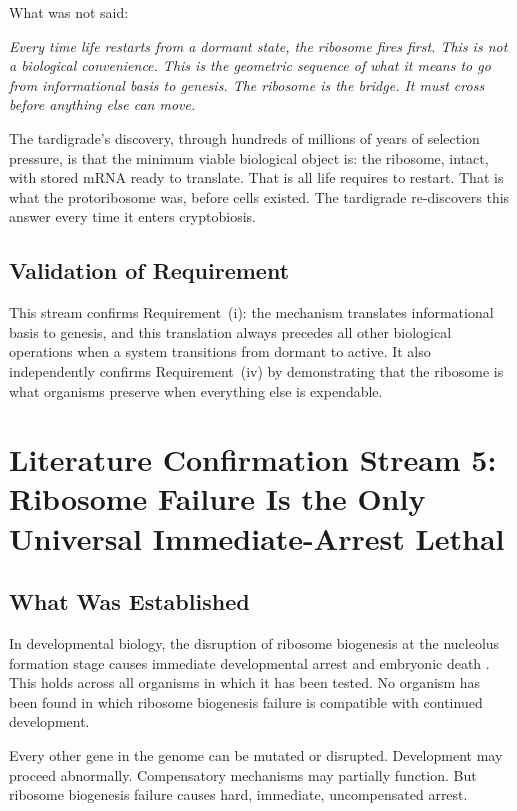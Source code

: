 \documentclass[11pt]{article}
\theoremstyle{definition}
\begin{document}
What was not said:

\emph{Every time life restarts from a dormant state, the ribosome
fires first.
This is not a biological convenience.
This is the geometric sequence of what it means to go from
informational basis to genesis.
The ribosome is the bridge.
It must cross before anything else can move.}

The tardigrade's discovery, through hundreds of millions of years
of selection pressure, is that the minimum viable biological object
is: the ribosome, intact, with stored mRNA ready to translate.
That is all life requires to restart.
That is what the protoribosome was, before cells existed.
The tardigrade re-discovers this answer every time it enters
cryptobiosis.

\subsection{Validation of Requirement}

This stream confirms Requirement~(i): the mechanism translates
informational basis to genesis, and this translation always
precedes all other biological operations when a system transitions
from dormant to active.
It also independently confirms Requirement~(iv) by demonstrating
that the ribosome is what organisms preserve when everything else
is expendable.

\section{Literature Confirmation Stream 5:\\
Ribosome Failure Is the Only Universal Immediate-Arrest Lethal}
\label{sec:literature5}

\subsection{What Was Established}

In developmental biology, the disruption of ribosome biogenesis
at the nucleolus formation stage causes immediate developmental
arrest and embryonic death \cite{Maddox2016}.
This holds across all organisms in which it has been tested.
No organism has been found in which ribosome biogenesis failure
is compatible with continued development.

Every other gene in the genome can be mutated or disrupted.
Development may proceed abnormally.
Compensatory mechanisms may partially function.
But ribosome biogenesis failure causes hard, immediate,
uncompensated arrest.
\end{document}
